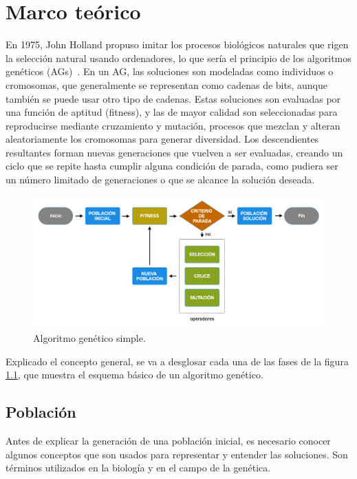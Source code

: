 \chapter{Marco teórico}
\label{ch:marco-teorico}

En 1975, John Holland propuso imitar los procesos biológicos naturales que rigen la selección natural usando ordenadores, lo que sería el principio de los algoritmos genéticos (AGs)~\cite{holland1975}. En un AG, las soluciones son modeladas como individuos o cromosomas, que generalmente se representan como cadenas de bits, aunque también se puede usar otro tipo de cadenas. Estas soluciones son evaluadas por una función de aptitud (fitness), y las de mayor calidad son seleccionadas para reproducirse mediante cruzamiento y mutación, procesos que mezclan y alteran aleatoriamente los cromosomas para generar diversidad. Los descendientes resultantes forman nuevas generaciones que vuelven a ser evaluadas, creando un ciclo que se repite hasta cumplir alguna condición de parada, como pudiera ser un número limitado de generaciones o que se alcance la solución deseada.

\begin{figure}[H]
    \centering
    \includegraphics[width=1\textwidth]{figures/algoritmo-genetico.png}
    \caption{Algoritmo genético simple.}
    \label{fig:algoritmo-genetico}
  \end{figure}

Explicado el concepto general, se va a desglosar cada una de las fases de la figura \ref{fig:algoritmo-genetico}, que muestra el esquema básico de un algoritmo genético.

\section{Población}

Antes de explicar la generación de una población inicial, es necesario conocer algunos conceptos que son usados para representar y entender las soluciones. Son términos utilizados en la biología y en el campo de la genética. 

